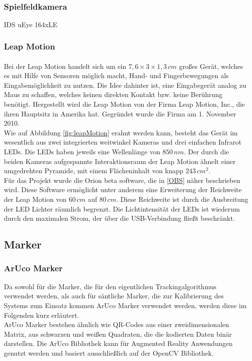\subsubsection{Spielfeldkamera} 
IDS uEye 164xLE

\subsubsection{Leap Motion} 	
Bei der Leap Motion\textsuperscript{\cite{website:LeapMotion}} handelt sich um ein $7,6\times3\times1,3\,cm$ großes Gerät, welches es mit Hilfe von Sensoren möglich macht, Hand- und Fingerbewegungen als Eingabemöglichkeit zu nutzen. Die Idee dahinter ist, eine Eingabegerät analog zu Maus zu schaffen, welches keinen direkten Kontakt bzw. keine Berührung benötigt. Hergestellt wird die Leap Motion von der Firma Leap Motion, Inc., die ihren Hauptsitz in Amerika hat. Gegründet wurde die Firma am 1. November 2010. \\
Wie auf Abbildung \ref{fig:leapMotion} erahnt werden kann, besteht das Gerät im wesentlich aus zwei integrierten weitwinkel Kameras und drei einfachen Infrarot LEDs. Die LEDs haben jeweils eine Wellenlänge von $850\,nm$. Der durch die beiden Kameras aufgespannte Interaktionsraum der Leap Motion ähnelt einer umgedrehten Pyramide, mit einem Flächeninhalt von knapp $243\,cm{^2}$. \\
Für das Projekt wurde die Orion beta software, die in \ref{OBS} näher beschrieben wird. Diese Software ermöglicht unter anderem eine Erweiterung der Reichweite der Leap Motion von $60\,cm$ auf $80\,cm$. Diese Reichweite ist durch die Ausbreitung der LED Lichter räumlich begrenzt. Die Lichtintensität der LEDs ist wiederum durch den maximalen Strom, der über die USB-Verbindung fließt beschränkt. \\

\subsection{Marker}
\subsubsection{ArUco Marker}
Da sowohl für die Marker, die für den eigentlichen Trackingalgorithmus verwendet werden, als auch für säntliche Marker, die zur Kalibrierung des Systems zum Einsatz kommen ArUco Marker verwendet werden, werden diese im Folgenden kurz erläutert.\\
ArUco Marker bestehen ähnlich wie QR-Codes aus einer zweidimensionalen Matrix, aus schwarzen und weißen Quadraten, die die kodierten Daten binär darstellen. Die ArUco Bibliothek kann für Augmented Reality Anwendungen genutzt werden und basiert ausschließlich auf der OpenCV Bibliothek. 
 
